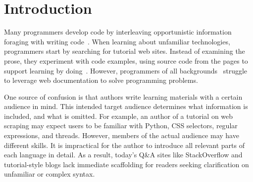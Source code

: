 \section{Introduction}

Many programmers develop code by interleaving opportunistic information foraging with writing code~\cite{brandt_two_2009}\cite{brandt_example-centric_2010}.
When learning about unfamiliar technologies, programmers start by searching for tutorial web sites.
Instead of examining the prose, they experiment with code examples, using source code from the pages to support learning by doing~\cite{brandt_two_2009}.
However, programmers of all backgrounds~\cite{duala-ekoko_asking_2012,dorn_lost_2013,dorn_learning_2010} struggle to leverage web documentation to solve programming problems.

One source of confusion is that authors write learning materials with a certain audience in mind.
This intended target audience determines what information is included, and what is omitted.
For example, an author of a tutorial on web scraping may expect users to be familiar with Python, CSS selectors, regular expressions, and threads.
However, members of the actual audience may have different skills.
It is impractical for the author to introduce all relevant parts of each language in detail.
As a result, today's Q\&A sites like StackOverflow and tutorial-style blogs lack immediate scaffolding for readers seeking clarification on unfamiliar or complex syntax. 

